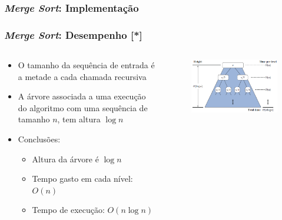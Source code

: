 \documentclass[aspectratio=169]{beamer}
\begin{document}
\begin{frame}\frametitle{\emph{Merge Sort}: Implementação}

\end{frame}

\begin{frame}\frametitle{\emph{Merge Sort}: Desempenho [*]}
\begin{columns}[T]
\begin{column}{0.4\linewidth}
\vspace{3mm}
\begin{itemize}
	\item O tamanho da sequência de entrada é a metade a cada chamada recursiva
	\item A árvore associada a uma execução do algoritmo com uma sequência de tamanho $n$, tem altura $\log n$
	\item Conclusões:
	\begin{itemize}
		\item Altura da árvore é $\log n$
		\item Tempo gasto em cada nível: $O(n)$
		\item Tempo de execução: $O(n\log n)$
	\end{itemize}
\end{itemize}
\end{column}
\begin{column}{0.6\linewidth}
\vspace{-3mm}
\begin{figure}[h]
	\centering
	\includegraphics[height=0.6\paperheight]{imagens/mergesort_desempenho.png}
\end{figure}
\end{column}
\end{columns}
\end{frame}
\end{document}

